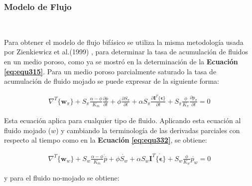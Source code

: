\subsubsection{Modelo de Flujo}~\hypertarget{sec:sec3323}{}
\label{sec:sec3323}

Para obtener el modelo de flujo bifásico se utiliza la misma metodología usada por Zienkiewicz et al.(1999) \cite{Zienkiewicz1999ComputationalGeomechanics}, para determinar la tasa de acumulación de fluidos en un medio poroso, como ya se mostró en la determinación de la \textbf{Ecuación} \textbf{\ref{eq:equ315}}. Para un medio poroso parcialmente saturado la tasa de acumulación de fluido mojado se puede expresar de la siguiente forma:\bigskip

\begin{ceqn} %
\begin{gather}\label{eq:equ340}
\nabla^T \{\mathbf{w}_{\pi}\} + S_{\pi} \frac{\alpha - \phi}{K_m}\frac{\partial \overline{p}}{\partial t} + \phi\frac{\partial S_{\pi}}{\partial t} + \alpha S_{\pi}\frac{\partial\mathbf{I}^T \{\mathbf{\epsilon}\}}{\partial t} + S_{\pi}\frac{\phi}{K_{\pi}}\frac{\partial p_{\pi}}{\partial t} = 0
\end{gather}   
\end{ceqn}
\bigskip

Esta ecuación aplica para cualquier tipo de fluido. Aplicando esta ecuación al fluido mojado ($w$) y cambiando la terminología de las derivadas parciales con respecto al tiempo como en la \textbf{Ecuación} \textbf{\ref{eq:equ332}}, se obtiene:

\begin{ceqn} %
\begin{gather}\label{eq:equ341}
\nabla^T \{\mathbf{w}_{w}\} + S_{w} \frac{\alpha - \phi}{K_m}\dot{\overline{p}}+ \phi\dot{S_{w}} + \alpha S_{w}\mathbf{I}^T \dot{\{\mathbf{\epsilon}\}} + S_{w}\frac{\phi}{K_{w}}\dot{p_{w}} = 0
\end{gather}   
\end{ceqn}
\bigskip
y para el fluido no-mojado se obtiene:

